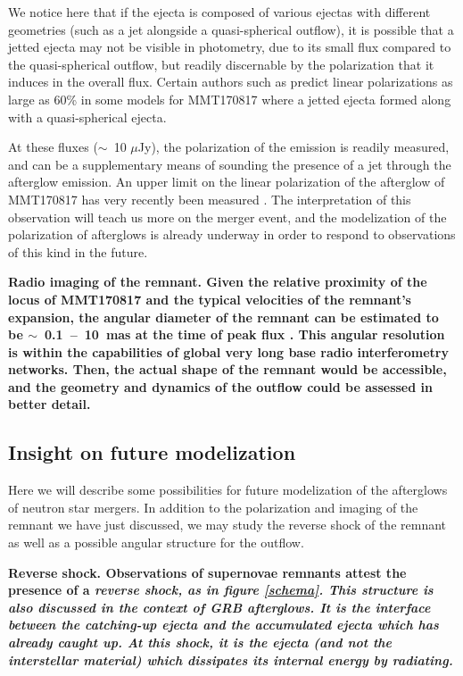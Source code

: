 We notice here that if the ejecta is composed of various ejectas with different geometries (such as a jet alongside a quasi-spherical outflow), it is possible that a jetted ejecta may not be visible in photometry, due to its small flux compared to the quasi-spherical outflow, but readily discernable by the polarization that it induces in the overall flux. Certain authors such as \citet{7} predict linear polarizations as large as 60\% in some models for MMT170817 where a jetted ejecta formed along with a quasi-spherical ejecta.

At these fluxes ($\sim$~10 $\mu$Jy), the polarization of the emission is readily measured, and can be a supplementary means of sounding the presence of a jet through the afterglow emission. An upper limit on the linear polarization of the afterglow of MMT170817 has very recently been measured \citep{63}. The interpretation of this observation will teach us more on the merger event, and the modelization of the polarization of afterglows is already underway in order to respond to observations of this kind in the future.

\bf{Radio imaging of the remnant.} Given the relative proximity of the locus of MMT170817 and the typical velocities of the remnant's expansion, the angular diameter of the remnant can be estimated to be $\sim$~0.1~--~10~mas at the time of peak flux \citep{7}. This angular resolution is within the capabilities of global very long base radio interferometry networks. Then, the actual shape of the remnant would be accessible, and the geometry and dynamics of the outflow could be assessed in better detail.

\subsection{Insight on future modelization}
\label{modelization}
Here we will describe some possibilities for future modelization of the afterglows of neutron star mergers. In addition to the polarization and imaging of the remnant we have just discussed, we may study the reverse shock of the remnant as well as a possible angular structure for the outflow.

\bf{Reverse shock.} Observations of supernovae remnants \citep[see][]{56} attest the presence of a \it{reverse shock}, as in figure \ref{schema}. This structure is also discussed in the context of GRB afterglows. It is the interface between the catching-up ejecta and the accumulated ejecta which has already caught up. At this shock, it is the ejecta (and not the interstellar material) which dissipates its internal energy by radiating.

